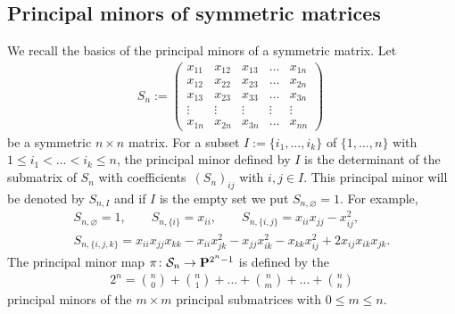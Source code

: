 \documentclass[10pt,a4paper]{amsart}
\newcommand{\PP}{{\bf P}}
\newcommand{\cS}{{\cal S}}
\numberwithin{equation}{section}
\providecommand{\cal}{\mathcal}
\begin{document}
\subsection{Principal minors of symmetric matrices} \label{pm}
We recall the basics of the principal minors of a symmetric matrix. Let
\begin{gather*}
S_n := \left(\begin{matrix} x_{11}&x_{12}&x_{13}&\ldots&x_{1n}\\
x_{12}&x_{22}&x_{23}&\ldots&x_{2n}\\
x_{13}&x_{23}&x_{33}&\ldots&x_{3n}\\
\vdots&\vdots&\vdots&\vdots&\vdots\\
x_{1n}&x_{2n}&x_{3n}&\ldots&x_{nn}
\end{matrix}\right)~
\end{gather*}
be a symmetric $n\times n$ matrix. For a subset $I:=\{i_1,\ldots,i_k\}$ of $\{1,\ldots,n\}$ with $1\leq i_1<\dots<i_k\allowbreak \leq n$, the principal minor defined by $I$ is the determinant of the submatrix of $S_n$ with coefficients~$(S_n)_{ij}$ with $i,j\in I$. This principal minor will be denoted by $S_{n,I}$ and if $I$ is the empty set we put $S_{n,\varnothing}=1$. For example,
\begin{gather*}
S_{n,\varnothing}=1,\qquad
S_{n,\{i\}}=x_{ii},\qquad
S_{n,\{i,j\}}=x_{ii}x_{jj} - x_{ij}^2,\\
S_{n,\{i,j,k\}}=x_{ii}x_{jj}x_{kk}-x_{ii}x_{jk}^2 - x_{jj}x_{ik}^2 - x_{kk}x_{ij}^2 + 2x_{ij}x_{ik}x_{jk}.
\end{gather*}
The principal minor map $\pi\colon \cS_n\rightarrow \PP^{2^{n}-1}$ is defined by the
\begin{gather*}
2^{n} = \binom{n}{0} + \binom{n}{1} + \dots +\binom{n}{m} + \dots + \binom{n}{n}
\end{gather*}
principal minors of the $m\times m$ principal submatrices with $0\leq m\leq n$.
\end{document}
